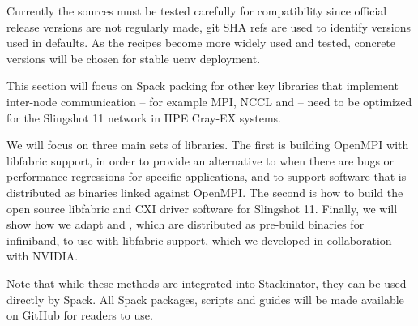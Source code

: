 Currently the \slingshot sources must be tested carefully for compatibility since official release versions are not regularly made,
git SHA refs are used to identify versions used in \stackinator defaults. As the recipes become more widely used and tested, concrete versions will be chosen for stable uenv deployment.


This section will focus on Spack packing for other key libraries that implement inter-node communication -- for example MPI, NCCL and \nvshmem -- need to be optimized for the Slingshot 11 network in HPE Cray-EX systems.

We will focus on three main sets of libraries. The first is building OpenMPI with libfabric support, in order to provide an alternative to \craympich when there are bugs or performance regressions for specific applications, and to support software that is distributed as binaries linked against OpenMPI. The second is how to build the open source libfabric and CXI driver software for Slingshot 11. Finally, we will show how we adapt \cufftmp and \cusolvermp, which are distributed as pre-build binaries for infiniband, to use \nvshmem with libfabric support, which we developed in collaboration with NVIDIA.

Note that while these methods are integrated into Stackinator, they can be used directly by Spack. All Spack packages, scripts and guides will be made available on GitHub for readers to use.
